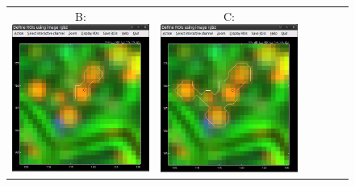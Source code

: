 \begin{figure}[!ht]
\begin{tabular}{cccccc}
B: \includegraphics[scale=0.23]{figs3/LANS-roi-interactive1}
&
C: \includegraphics[scale=0.23]{figs3/LANS-roi-interactive2}

\end{tabular}
\end{figure}
